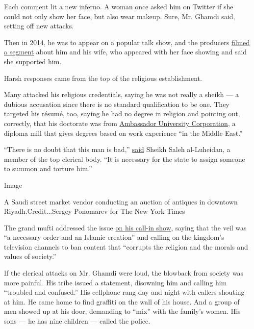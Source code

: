 Each comment lit a new inferno. A woman once asked him on Twitter if she
could not only show her face, but also wear makeup. Sure, Mr. Ghamdi
said, setting off new attacks.

Then in 2014, he was to appear on a popular talk show, and the producers
\href{http://www.mbc.net/ar/programs/badriya/articles/-\%D8\%A8\%D8\%AF\%D8\%B1\%D9\%8A\%D8\%A9--\%D8\%AA\%D8\%B3\%D8\%AA\%D8\%B6\%D9\%8A\%D9\%81--\%D8\%A7\%D9\%84\%D8\%BA\%D8\%A7\%D9\%85\%D8\%AF\%D9\%8A--\%D9\%85\%D8\%B9-\%D8\%B2\%D9\%88\%D8\%AC\%D8\%AA\%D9\%87-\%D9\%81\%D9\%8A-\%D8\%A3\%D9\%88\%D9\%84-\%D8\%B8\%D9\%87\%D9\%88\%D8\%B1-\%D9\%84\%D9\%87\%D8\%A7.html}{filmed
a segment} about him and his wife, who appeared with her face showing
and said she supported him.

Harsh responses came from the top of the religious establishment.

Many attacked his religious credentials, saying he was not really a
sheikh --- a dubious accusation since there is no standard qualification
to be one. They targeted his résumé, too, saying he had no degree in
religion and pointing out, correctly, that his doctorate was from
\href{http://www.ambassador-university.com/index.php?option=com_content\&task=view\&id=21\&Itemid=43}{Ambassador
University Corporation}, a diploma mill that gives degrees based on work
experience ``in the Middle East.''

``There is no doubt that this man is bad,''
\href{https://www.youtube.com/watch?v=mY35rIEFCO8\&app=desktop}{said}
Sheikh Saleh al-Luheidan, a member of the top clerical body. ``It is
necessary for the state to assign someone to summon and torture him.''

Image

A Saudi street market vendor conducting an auction of antiques in
downtown Riyadh.Credit...Sergey Ponomarev for The New York Times

The grand mufti addressed the issue
\href{https://www.youtube.com/watch?v=BxXin1ITQvM}{on his call-in show},
saying that the veil was ``a necessary order and an Islamic creation''
and calling on the kingdom's television channels to ban content that
``corrupts the religion and the morals and values of society.''

If the clerical attacks on Mr. Ghamdi were loud, the blowback from
society was more painful. His tribe issued a statement, disowning him
and calling him ``troubled and confused.'' His cellphone rang day and
night with callers shouting at him. He came home to find graffiti on the
wall of his house. And a group of men showed up at his door, demanding
to ``mix'' with the family's women. His sons --- he has nine children
--- called the police.


